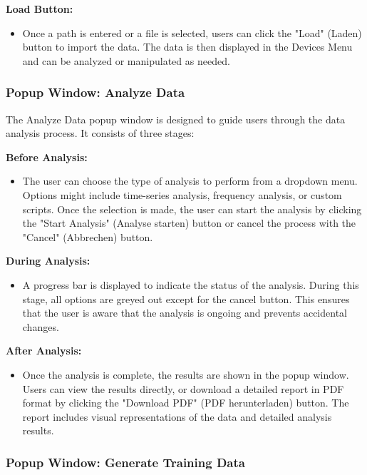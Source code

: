 \documentclass[]{scrreprt}
\begin{document}
\textbf{Load Button:}
\begin{itemize}
    \item Once a path is entered or a file is selected, users can click the "Load" (Laden) button to import the data. The data is then displayed in the Devices Menu and can be analyzed or manipulated as needed.
\end{itemize}

\subsubsection{Popup Window: Analyze Data} \label{cap:PopupWindow_analysedata}

The Analyze Data popup window is designed to guide users through the data analysis process. It consists of three stages:

\textbf{Before Analysis:}
\begin{itemize}
    \item The user can choose the type of analysis to perform from a dropdown menu. Options might include time-series analysis, frequency analysis, or custom scripts. Once the selection is made, the user can start the analysis by clicking the "Start Analysis" (Analyse starten) button or cancel the process with the "Cancel" (Abbrechen) button.
\end{itemize}

\textbf{During Analysis:}
\begin{itemize}
    \item A progress bar is displayed to indicate the status of the analysis. During this stage, all options are greyed out except for the cancel button. This ensures that the user is aware that the analysis is ongoing and prevents accidental changes.
\end{itemize}

\textbf{After Analysis:}
\begin{itemize}
    \item Once the analysis is complete, the results are shown in the popup window. Users can view the results directly, or download a detailed report in PDF format by clicking the "Download PDF" (PDF herunterladen) button. The report includes visual representations of the data and detailed analysis results.
\end{itemize}

\subsubsection{Popup Window: Generate Training Data} \label{cap:PopupWindow_generate_training_data}
\end{document}
